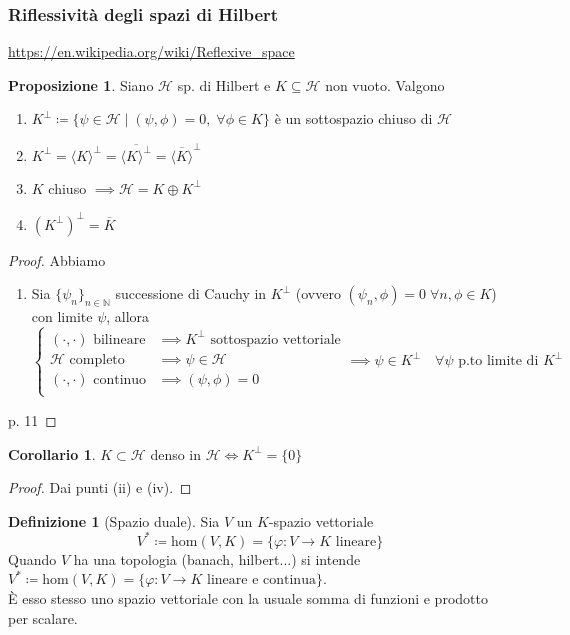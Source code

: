 \documentclass[a4paper,10pt]{article}
\theoremstyle{definition}
\newcommand{\na}{\mathbb{N}} %
\newcommand{\hil}{\mathcal{H}} %
\newcommand{\spann}[1]{\langle #1\rangle}
\theoremstyle{indentdefinition}
\newtheorem{defn}{Definizione}[section]
\theoremstyle{indenttheorem}
\newtheorem{prop}{Proposizione}
\newtheorem{cor}{Corollario}
\theoremstyle{myremark}
\theoremstyle{indentgeneral}
\begin{document}
\subsubsection{Riflessività degli spazi di Hilbert}
\url{https://en.wikipedia.org/wiki/Reflexive_space}
\begin{prop}
    Siano $\hil$ sp. di Hilbert e $K\subseteq\hil$ non vuoto. Valgono
    \begin{enumerate}
        \item $K^\perp\coloneqq\{\psi\in\hil\mid (\psi,\phi)=0,\;\forall\phi\in K\}$ è un sottospazio chiuso di $\hil$
        \item $K^\perp=\spann{K}^\perp=\overline{\spann{K}^\perp}=\overline{\spann{K}}^\perp$
        \item $K$ chiuso $\implies \hil = K\oplus K^\perp$
        \item $(K^\perp)^\perp=\overline{K}$
    \end{enumerate}
\end{prop}

\begin{proof}
    Abbiamo 
    \begin{enumerate}
        \item Sia $\{\psi_n\}_{n\in\na}$ successione di Cauchy in $K^\perp$ (ovvero $(\psi_n,\phi)=0\;\forall n,\phi\in K$) con limite $\psi$, allora
        $$\begin{cases}
            (\cdot,\cdot) \text{ bilineare}&\implies K^\perp\text{ sottospazio vettoriale}\\
            \hil \text{ completo} &\implies\psi\in \hil\\
             (\cdot,\cdot) \text{ continuo}&\implies (\psi,\phi)=0\\
        \end{cases}\implies\psi\in K^\perp \quad\forall\psi \text{ p.to limite di }K^\perp$$
    \end{enumerate}
    \item p. 11
\end{proof}

\begin{cor}
    $K\subset \hil$ denso in $\hil \iff K^\perp=\{0\}$
\end{cor}

\begin{proof}
    Dai punti (ii) e (iv).
\end{proof}

\begin{defn}[Spazio duale]
    Sia $V$ un $K$-spazio vettoriale $$V^*\coloneqq \text{hom}(V,K)=\{\varphi:V\to K\text{ lineare}\}$$
    Quando $V$ ha una topologia (banach, hilbert...) si intende $V^*\coloneqq \text{hom}(V,K)=\{\varphi:V\to K\text{ lineare e continua}\}$.\\
    È esso stesso uno spazio vettoriale con la usuale somma di funzioni e prodotto per scalare.
\end{defn}
\end{document}
